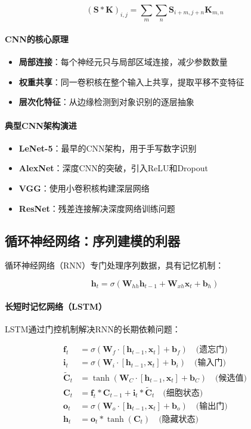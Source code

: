 $$(\mathbf{S} * \mathbf{K})_{i,j} = \sum_m \sum_n \mathbf{S}_{i+m,j+n} \mathbf{K}_{m,n}$$

\paragraph{CNN的核心原理}
\begin{itemize}
\item \textbf{局部连接}：每个神经元只与局部区域连接，减少参数数量
\item \textbf{权重共享}：同一卷积核在整个输入上共享，提取平移不变特征
\item \textbf{层次化特征}：从边缘检测到对象识别的逐层抽象
\end{itemize}

\paragraph{典型CNN架构演进}
\begin{itemize}
\item \textbf{LeNet-5}：最早的CNN架构，用于手写数字识别
\item \textbf{AlexNet}：深度CNN的突破，引入ReLU和Dropout
\item \textbf{VGG}：使用小卷积核构建深层网络
\item \textbf{ResNet}：残差连接解决深度网络训练问题
\end{itemize}

\subsection{循环神经网络：序列建模的利器}

循环神经网络（RNN）专门处理序列数据，具有记忆机制：

$$\mathbf{h}_t = \sigma(\mathbf{W}_{hh} \mathbf{h}_{t-1} + \mathbf{W}_{xh} \mathbf{x}_t + \mathbf{b}_h)$$

\paragraph{长短时记忆网络（LSTM）}
LSTM通过门控机制解决RNN的长期依赖问题：

\begin{align}
\mathbf{f}_t &= \sigma(\mathbf{W}_f \cdot [\mathbf{h}_{t-1}, \mathbf{x}_t] + \mathbf{b}_f) \quad \text{(遗忘门)} \\
\mathbf{i}_t &= \sigma(\mathbf{W}_i \cdot [\mathbf{h}_{t-1}, \mathbf{x}_t] + \mathbf{b}_i) \quad \text{(输入门)} \\
\tilde{\mathbf{C}}_t &= \tanh(\mathbf{W}_C \cdot [\mathbf{h}_{t-1}, \mathbf{x}_t] + \mathbf{b}_C) \quad \text{(候选值)} \\
\mathbf{C}_t &= \mathbf{f}_t * \mathbf{C}_{t-1} + \mathbf{i}_t * \tilde{\mathbf{C}}_t \quad \text{(细胞状态)} \\
\mathbf{o}_t &= \sigma(\mathbf{W}_o \cdot [\mathbf{h}_{t-1}, \mathbf{x}_t] + \mathbf{b}_o) \quad \text{(输出门)} \\
\mathbf{h}_t &= \mathbf{o}_t * \tanh(\mathbf{C}_t) \quad \text{(隐藏状态)}
\end{align}

